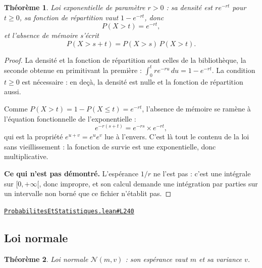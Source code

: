 \documentclass[11pt,a4paper]{article}
\theoremstyle{definition}
\theoremstyle{plain}
\newtheorem{theoreme}{Théorème}
\newcommand{\source}[2]{\par\smallskip\noindent\hfill{\footnotesize\href{#1}{\texttt{#2}}}\par\smallskip}
\begin{document}
\begin{theoreme}
Loi exponentielle de paramètre $r > 0$ : sa densité est $r e^{-rt}$ pour $t \ge 0$, sa
fonction de répartition vaut $1 - e^{-rt}$, donc
\[ P(X > t) = e^{-rt} , \]
et l'absence de mémoire s'écrit
\[ P(X > s + t) = P(X > s)\,P(X > t) . \]
\end{theoreme}

\begin{proof}
La densité et la fonction de répartition sont celles de la bibliothèque, la seconde
obtenue en primitivant la première : $\int_0^t r e^{-ru}\,du = 1 - e^{-rt}$. La condition
$t \ge 0$ est nécessaire : en deçà, la densité est nulle et la fonction de répartition
aussi.

Comme $P(X > t) = 1 - P(X \le t) = e^{-rt}$, l'absence de mémoire se ramène à l'équation
fonctionnelle de l'exponentielle :
\[ e^{-r(s+t)} = e^{-rs} \times e^{-rt} , \]
qui est la propriété $e^{u+v} = e^{u}e^{v}$ lue à l'envers. C'est là tout le contenu de la
\og{} loi sans vieillissement \fg{} : la fonction de survie est une exponentielle, donc
multiplicative.

\medskip\noindent
\textbf{Ce qui n'est pas démontré.} L'espérance $1/r$ ne l'est pas : c'est une intégrale
sur $[0, +\infty[$, donc impropre, et son calcul demande une intégration par parties sur un
intervalle non borné que ce fichier n'établit pas.
\end{proof}
\source{https://github.com/Commutator-IO/learn-lean/blob/main/cours/02-lycee/09-probabilites-et-statistiques/ProbabilitesEtStatistiques.lean\#L240}{ProbabilitesEtStatistiques.lean\#L240}

\subsection{Loi normale}

\begin{theoreme}
Loi normale $\mathcal{N}(m, v)$ : son espérance vaut $m$ et sa variance $v$.
\end{theoreme}
\end{document}
